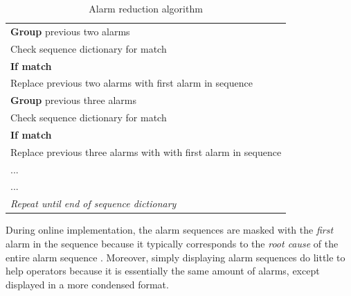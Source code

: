 \begin{table}[H]
{\begin{tabular}{p{14cm}}
	\hspace{1cm} \textbf{Group} previous two alarms \\
	\hspace{1.5cm} Check sequence dictionary for match \\
	\hspace{1.5cm} \textbf{If match} \\
	\hspace{2cm} Replace previous two alarms with first alarm in sequence \\
	\hspace{1cm} \textbf{Group} previous three alarms \\
	\hspace{1.5cm} Check sequence dictionary for match \\
	\hspace{1.5cm} \textbf{If match} \\
	\hspace{2cm} Replace previous three alarms with with first alarm in sequence \\
	\hspace{1.5cm} ... \\
	\hspace{1.5cm} ... \\
	\hspace{1cm} \emph{Repeat until end of sequence dictionary} \\
	\hline
	\end{tabular}}
	\caption{Alarm reduction algorithm}
	\label{alg:03AlarmReduce}
\end{table}

During online implementation, the alarm sequences are masked with the \textit{first} alarm in the sequence because it typically corresponds to the \textit{root cause} of the entire alarm sequence \cite{alarm_sequence}.  Moreover, simply displaying alarm sequences do little to help operators because it is essentially the same amount of alarms, except displayed in a more condensed format.

